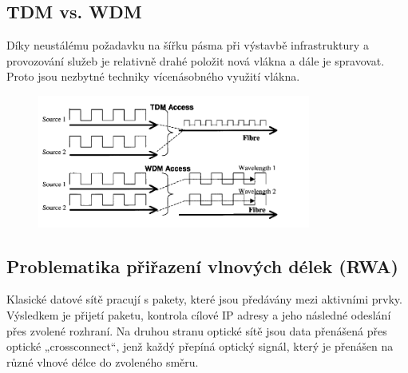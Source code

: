 \subsection{TDM vs. WDM}
Díky neustálému požadavku na šířku pásma při výstavbě infrastruktury a provozování služeb je relativně drahé položit nová vlákna a dále je
spravovat. Proto jsou nezbytné techniky vícenásobného využití vlákna.
\begin{figure} [h]
    \centering
    \includegraphics[width=0.8\textwidth]{snimky/TDMvsWDM.png}
    \label{fig:uml}
\end{figure}

\subsection{Problematika přiřazení vlnových délek (RWA)}
Klasické datové sítě pracují s pakety, které jsou předávány mezi aktivními prvky. Výsledkem je přijetí paketu, kontrola cílové IP adresy a jeho následné odeslání přes zvolené rozhraní. Na druhou stranu optické sítě jsou data přenášená přes optické „crossconnect“, jenž každý přepíná optický signál, který je přenášen na různé vlnové délce do zvoleného směru.